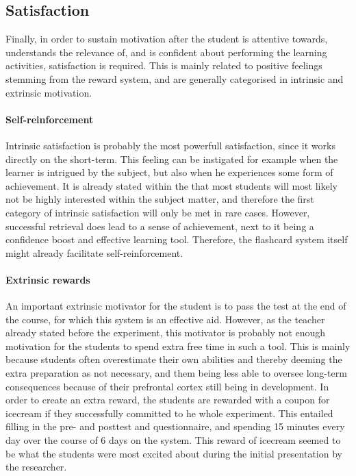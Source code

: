         
        \subsection{Satisfaction}

Finally, in order to sustain motivation after the student is attentive towards, understands the relevance of, and is confident about performing the learning activities, satisfaction is required. This is mainly related to positive feelings stemming from the reward system, and are generally categorised in intrinsic and extrinsic motivation.

\paragraph{Self-reinforcement} Intrinsic satisfaction is probably the most powerfull satisfaction, since it works directly on the short-term. This feeling can be instigated for example when the learner is intrigued by the subject, but also when he experiences some form of achievement. It is already stated within the  that most students will most likely not be highly interested within the subject matter, and therefore the first category of intrinsic satisfaction will only be met in rare cases. However, successful retrieval does lead to a sense of achievement, next to it being a confidence boost and effective learning tool. Therefore, the flashcard system itself might already facilitate self-reinforcement.

\paragraph{Extrinsic rewards} An important extrinsic motivator for the student is to pass the test at the end of the course, for which this system is an effective aid. However, as the teacher already stated before the experiment, this motivator is probably not enough motivation for the students to spend extra free time in such a tool. This is mainly because students often overestimate their own abilities and thereby deeming the extra preparation as not necessary, and them being less able to oversee long-term consequences because of their prefrontal cortex still being in development. In order to create an extra reward, the students are rewarded with a coupon for icecream if they successfully committed to he whole experiment. This entailed filling in the pre- and posttest and questionnaire, and spending 15 minutes every day over the course of 6 days on the system. This reward of icecream seemed to be what the students were most excited about during the initial presentation by the researcher.

